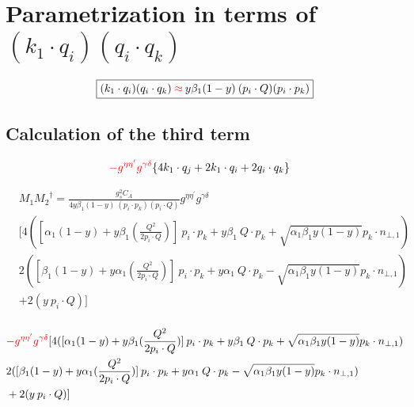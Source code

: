 \section*{Parametrization in terms of $ (k_1 \cdot q_i )(q_i \cdot q_k) $}
\begin{equation}
	\begin{aligned}
		\fbox{$  (k_1 \cdot q_i )(q_i \cdot q_k) {\color[RGB]{255,0,0} \: \approx\:} y\beta_1 (1-y)\:(p_i \cdot Q)(p_i \cdot p_k) $}
    \end{aligned}
\end{equation}

\subsection*{Calculation of the third term}

\begin{equation}
\begin{split}
&{\color[RGB]{255,0,0} -g^{{{\eta}}{{\eta}^{\prime}}}g^{{{\gamma}}{{\delta}}}}\lbrace 4{k_1}\cdot q_j+2k_1 \cdot q_i +2q_i \cdot q_k\rbrace
\end{split}
\end{equation}

\begin{equation}
\begin{split}
&M_1{M_2}^{\dagger}=\frac{g_s^2 C_A}{4y\beta_1 (1-y)\:(p_i \cdot p_k)(p_i \cdot Q)}
g^{{{\eta}}{{\eta}^{\prime}}}g^{{{\gamma}}{{\delta}}} \\
&[4([\alpha_1 (1-y)+y\beta_1(\frac{Q^2}{2p_i \cdot Q})]\:p_i \cdot p_k+y\beta_1\:Q\cdot p_k+\sqrt{\alpha_1\beta_1y(1-y)} p_k \cdot {n_{\bot,1}})\\
&2([\beta_1 (1-y)+y\alpha_1(\frac{Q^2}{2p_i \cdot Q})]\:p_i \cdot p_k+y\alpha_1\:Q\cdot p_k-\sqrt{\alpha_1\beta_1y(1-y)} p_k \cdot {n_{\bot,1}})\\
&+2(y\:p_i\cdot Q)]\\
\end{split}
\end{equation}

\begin{equation}
\begin{split}
&{\color[RGB]{255,0,0} -g^{{{\eta}}{{\eta}^{\prime}}}g^{{{\gamma}}{{\delta}}}}[ 4([\alpha_1 (1-y)+y\beta_1(\frac{Q^2}{2p_i \cdot Q})]\:p_i \cdot p_k+y\beta_1\:Q\cdot p_k+\sqrt{\alpha_1\beta_1y(1-y)} p_k \cdot {n_{\bot,1}})\\
&2([\beta_1 (1-y)+y\alpha_1(\frac{Q^2}{2p_i \cdot Q})]\:p_i \cdot p_k+y\alpha_1\:Q\cdot p_k-\sqrt{\alpha_1\beta_1y(1-y)} p_k \cdot {n_{\bot,1}})\\
&+2(y\:p_i\cdot Q)]
\end{split}
\end{equation}

